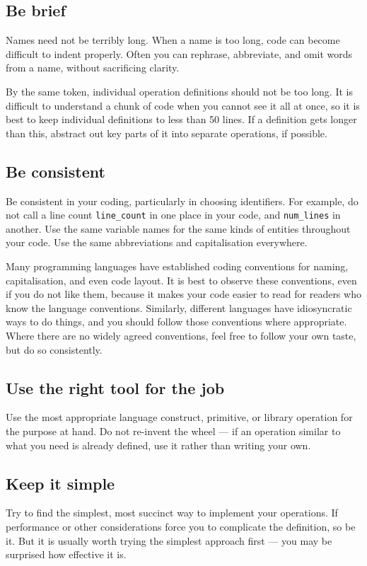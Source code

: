 \documentclass[a4paper]{article}
\begin{document}
\subsection{Be brief}
Names need not be terribly long.  When a name is too long, code can become
difficult to indent properly.  Often you can rephrase, abbreviate, and omit
words from a name, without sacrificing clarity.

By the same token, individual operation definitions should not be too long.
It is difficult to understand a chunk of code when you cannot see it all at
once, so it is best to keep individual definitions to less than 50 lines.  If
a definition gets longer than this, abstract out key parts of it into
separate operations, if possible.

\subsection{Be consistent}
Be consistent in your coding, particularly in choosing identifiers.  For
example, do not call a line count \texttt{line\_count} in one place in your
code, and \texttt{num\_lines} in another.  Use the same
variable names for the same kinds of entities throughout your code.
Use the same abbreviations and capitalisation everywhere.

Many programming languages have established coding conventions for naming,
capitalisation, and even code layout.  It is best to observe these
conventions, even if you do not like them, because it makes your code
easier to read for readers who know the language conventions.  Similarly,
different languages have idiosyncratic ways to do things, and you should
follow those conventions where appropriate.  Where there are no
widely agreed conventions, feel free to follow your own taste, but do so
consistently.

\subsection{Use the right tool for the job}
Use the most appropriate language construct, primitive, or library operation
for the purpose at hand.  Do not re-invent the wheel --- if an operation
similar to what you need is already defined, use it rather than writing your
own.

\subsection{Keep it simple}
Try to find the simplest, most succinct way to implement your operations.  If
performance or other considerations force you to complicate the definition,
so be it.  But it is usually worth trying the simplest approach first --- you
may be surprised how effective it is.
\end{document}
